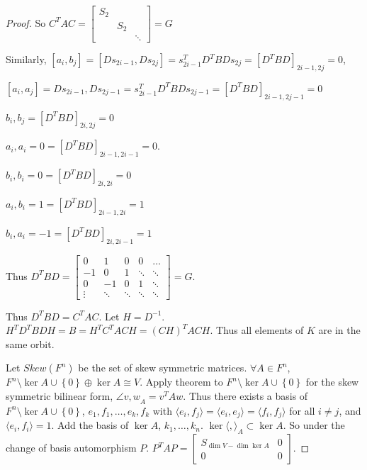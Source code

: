 \documentclass{article}
\newcommand{\angles}[1]{\langle #1 \rangle}
\begin{document}
\begin{proof}
    So $C^T A C = \begin{bmatrix}
        S_2 \\
        & S_2 \\
        & & \ddots
    \end{bmatrix} = G$ 

    Similarly, $[a_i, b_j] = [Ds_{2i - 1}, Ds_{2j}] = s_{2i - 1}^T D^T B D s_{2j} = [D^T B D]_{2i - 1, 2j} = 0$, 
    
    $[a_i, a_j] = {Ds_{2i - 1}, Ds_{2j - 1}} = s_{2i - 1}^T D^T B D s_{2j - 1} = [D^T B D]_{2i - 1, 2j - 1} = 0$
    
    ${b_i, b_j} = [D^T B D]_{2i, 2j} = 0$

    ${a_i, a_i} = 0 = [D^T B D]_{2i - 1, 2i - 1} = 0$.
    
    ${b_i, b_i} = 0 = [D^T B D]_{2i, 2i} = 0$
    
    ${a_i, b_i} = 1 = [D^T B D]_{2i - 1, 2i} = 1$
    
    ${b_i, a_i} = -1 = [D^T B D]_{2i, 2i - 1} = 1$

    Thus $D^T B D = \begin{bmatrix}
        0 & 1 & 0 & 0 & \hdots\\
        -1 & 0 & 1 & \ddots & \ddots\\
        0 & -1 & 0 & 1 & \ddots\\
        \vdots & \ddots& \ddots & \ddots & \ddots
    \end{bmatrix} = G$.
    
    Thus $D^T B D = C^T A C$. Let $H = D^{-1}$. $H^{T} D^T B D H = B = H^T C^T A C H = (CH)^T A CH$. Thus all elements of $K$ are in the same orbit.



    
    
    Let $Skew(F^n)$ be the set of skew symmetric matrices. $\forall A \in F^n$, $F^n \setminus \ker A \cup \left\{ 0 \right\} \oplus \ker A \cong V$. Apply theorem to $F^n \setminus \ker A \cup \left\{ 0 \right\}$ for the skew symmetric bilinear form, $\angle{v, w}_A = v^T A w$. Thus there exists a basis of $F^n \setminus \ker A \cup \left\{ 0 \right\}$, $e_1,f_1, \dots, e_k,f_k$ with $\angles{e_i,f_j} = \angles{e_i, e_j} = \angles{f_i, f_j}$ for all $i \neq j$, and $\angles{e_i,f_i} =1$. Add the basis of $\ker A$, $k_1, \dots, k_n$. $ \ker\angles{ , }_A \subset \ker A$. So under the change of basis automorphism $P$. $P^T A P = \begin{bmatrix}
        S_{\dim V - \dim \ker A} & 0 \\
        0 & 0
    \end{bmatrix}$.
    

\end{proof}
\end{document}
